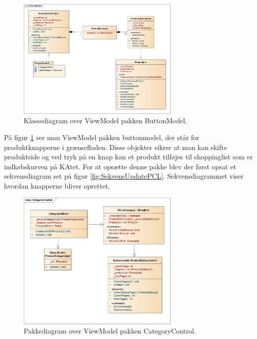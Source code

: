 \begin{figure}[H]
	\centering
	\includegraphics[width=0.7\textwidth]{Systemdesign/Frontend/GUI/DesignOgStruktur/Pics/KlassediagramButtonModel}
	\caption{Klassediagram over ViewModel pakken ButtonModel.}
	\label{fig:ButtonModel}
\end{figure}

På figur \ref{fig:ButtonModel} ser man ViewModel pakken buttonmodel, der står for produktknapperne i grænsefladen. Disse objekter sikrer at man kan skifte produktside og ved tryk på en knap kan et produkt tilføjes til shoppinglist som er indkøbskurven på \gls{KA}tet. For at opsætte denne pakke blev der først opsat et sekvensdiagram set på figur \ref{fig:SekvensUpdatePCL}. Sekvensdiagrammet viser hvordan knapperne bliver oprettet.

\begin{figure}[H]
	\centering
	\includegraphics[width=0.7\textwidth]{Systemdesign/Frontend/GUI/DesignOgStruktur/Pics/KlassediagramCategoryControl}
	\caption{Pakkediagram over ViewModel pakken CategoryControl.}
	\label{fig:CategoryControl}
\end{figure}

